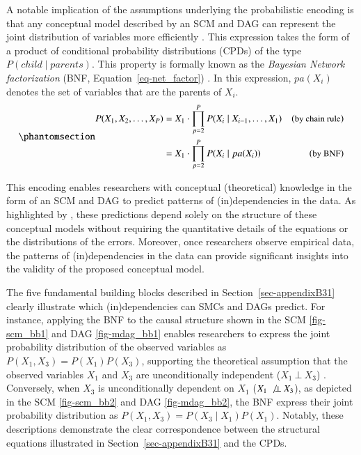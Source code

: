 \documentclass[
  authoryear,
  review,
  1p]{elsarticle}
\begin{document}
A notable implication of the assumptions underlying the probabilistic
encoding is that any conceptual model described by an SCM and DAG can
represent the joint distribution of variables more efficiently
\citep[pp.~29]{Pearl_et_al_2016}. This expression takes the form of a
product of conditional probability distributions (CPDs) of the type
\(P(child \mid parents)\). This property is formally known as the
\emph{Bayesian Network factorization} (BNF,
Equation~\ref{eq-net_factor})
\citetext{\citealp[pp.~29]{Pearl_et_al_2016}; \citealp[pp.~21]{Neal_2020}}.
In this expression, \(pa(X_{i})\) denotes the set of variables that are
the parents of \(X_{i}\).
\begin{equation}\phantomsection\label{eq-net_factor}{
\begin{aligned}
P(X_{1}, X_{2}, \dots, X_{P}) & = X_{1} \cdot \prod^{P}_{p=2} P(X_{i} \mid X_{i-1}, \dots, X_{1}) & (\small{\text{by chain rule})}\\
& = X_{1} \cdot \prod^{P}_{p=2} P(X_{i} \mid pa(X_{i}) ) & (\small{\text{by BNF}})
\end{aligned}
}\end{equation}

This encoding enables researchers with conceptual (theoretical)
knowledge in the form of an SCM and DAG to predict patterns of
(in)dependencies in the data. As highlighted by
\citet[pp.~35]{Pearl_et_al_2016}, these predictions depend solely on the
structure of these conceptual models without requiring the quantitative
details of the equations or the distributions of the errors. Moreover,
once researchers observe empirical data, the patterns of
(in)dependencies in the data can provide significant insights into the
validity of the proposed conceptual model.

The five fundamental building blocks described in
Section~\ref{sec-appendixB31} clearly illustrate which (in)dependencies
can SMCs and DAGs predict. For instance, applying the BNF to the causal
structure shown in the SCM \ref{fig-scm_bb1} and DAG \ref{fig-mdag_bb1}
enables researchers to express the joint probability distribution of the
observed variables as \(P(X_{1}, X_{3}) = P(X_{1}) P(X_{3})\),
supporting the theoretical assumption that the observed variables
\(X_{1}\) and \(X_{3}\) are unconditionally independent
(\(X_{1} \:\bot\:X_{3}\)) \citep[pp.~24]{Neal_2020}. Conversely, when
\(X_{3}\) is unconditionally dependent on \(X_{1}\)
(\(X_{1} \:\not\bot\:X_{3}\)), as depicted in the SCM \ref{fig-scm_bb2}
and DAG \ref{fig-mdag_bb2}, the BNF express their joint probability
distribution as \(P(X_{1}, X_{3}) = P(X_{3} \mid X_{1}) P(X_{1})\).
Notably, these descriptions demonstrate the clear correspondence between
the structural equations illustrated in Section~\ref{sec-appendixB31}
and the CPDs.
\end{document}

